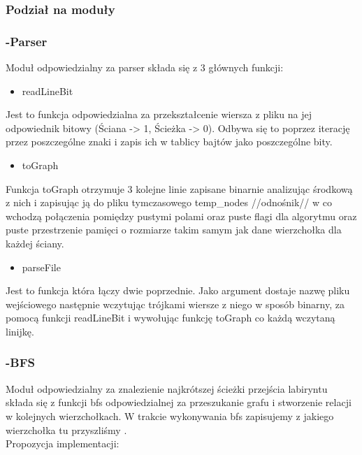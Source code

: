 \documentclass[
]{article}
\begin{document}
\hypertarget{podziaux142-na-moduux142y}{%
\subsubsection{\texorpdfstring{Podział na moduły
}{Podział na moduły }}\label{podziaux142-na-moduux142y}}

\hypertarget{parser}{%
\subsubsection{-Parser}\label{parser}}

Moduł odpowiedzialny za parser składa się z 3 głównych funkcji:

\begin{itemize}
\item
  readLineBit
\end{itemize}

Jest to funkcja odpowiedzialna za przekształcenie wiersza z pliku na jej
odpowiednik bitowy (Ściana -\textgreater{} 1, Ścieżka -\textgreater{}
0). Odbywa się to poprzez iterację przez poszczególne znaki i zapis ich
w tablicy bajtów jako poszczególne bity.

\begin{itemize}
\item
  toGraph
\end{itemize}

Funkcja toGraph otrzymuje 3 kolejne linie zapisane binarnie analizując
środkową z nich i zapisując ją do pliku tymczasowego temp\_nodes
//odnośnik// w co wchodzą połączenia pomiędzy pustymi polami oraz puste
flagi dla algorytmu oraz puste przestrzenie pamięci o rozmiarze takim
samym jak dane wierzchołka dla każdej ściany.

\begin{itemize}
\item
  parseFile
\end{itemize}

Jest to funkcja która łączy dwie poprzednie. Jako argument dostaje nazwę
pliku wejściowego następnie wczytując trójkami wiersze z niego w sposób
binarny, za pomocą funkcji readLineBit i wywołując funkcję toGraph co
każdą wczytaną linijkę.

\hypertarget{bfs}{%
\subsubsection{-BFS}\label{bfs}}

Moduł odpowiedzialny za znalezienie najkrótszej ścieżki przejścia
labiryntu\\
składa się z funkcji bfs odpowiedzialnej za przeszukanie grafu i
stworzenie relacji w kolejnych wierzchołkach. W trakcie wykonywania bfs
zapisujemy z jakiego wierzchołka tu przyszliśmy .\\
Propozycja implementacji:
\end{document}
